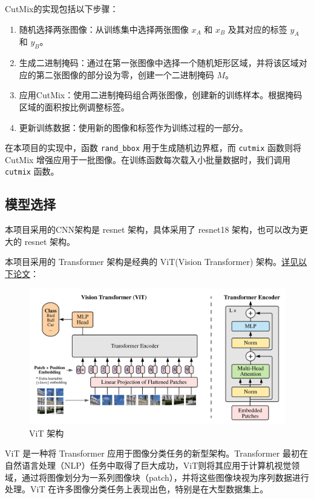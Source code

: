 \documentclass[notitlepage,cs4size,punct,oneside]{ctexrep}
\numberwithin{equation}{chapter}
\theoremstyle{mystyle}
\begin{document}
CutMix的实现包括以下步骤：
\begin{enumerate}
    \item 随机选择两张图像：从训练集中选择两张图像 $x_A$ 和 $x_B$ 及其对应的标签 $y_A$ 和 $y_B$。
    \item 生成二进制掩码：通过在第一张图像中选择一个随机矩形区域，并将该区域对应的第二张图像的部分设为零，创建一个二进制掩码 $M$。
    \item 应用CutMix：使用二进制掩码组合两张图像，创建新的训练样本。根据掩码区域的面积按比例调整标签。
    \item 更新训练数据：使用新的图像和标签作为训练过程的一部分。
\end{enumerate}

在本项目的实现中，函数 \texttt{rand\_bbox} 用于生成随机边界框，而 \texttt{cutmix} 函数则将 CutMix 增强应用于一批图像。在训练函数每次载入小批量数据时，我们调用\texttt{cutmix} 函数。


\subsection{模型选择}
本项目采用的CNN架构是 resnet 架构，具体采用了 resnet18 架构，也可以改为更大的 resnet 架构。

本项目采用的 Transformer 架构是经典的 ViT(Vision Transformer) 架构。\href{https://arxiv.org/pdf/2010.11929.pdf?fbclid=IwAR1NafJDhZjkARvCswpV6kS9_hMa0ycvzwhlCb7cqAGwgzComFXcScxgA8o}{详见以下论文}：
\begin{figure}[H]
    \centering
    \includegraphics[scale=0.55]{ViT.png}
    \caption{ViT 架构}
\end{figure}
ViT 是一种将 Transformer 应用于图像分类任务的新型架构。Transformer 最初在自然语言处理（NLP）任务中取得了巨大成功，ViT则将其应用于计算机视觉领域，通过将图像划分为一系列图像块（patch），并将这些图像块视为序列数据进行处理。ViT 在许多图像分类任务上表现出色，特别是在大型数据集上。
\end{document}
